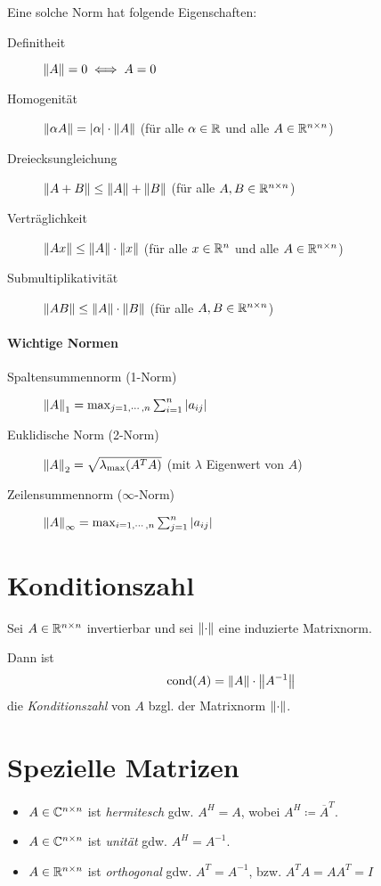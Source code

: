 		Eine solche Norm hat folgende Eigenschaften:
		\begin{description}
			\item[Definitheit] \( \norm{A} = 0 \iff A = 0 \)
			\item[Homogenität] \( \norm{\alpha A} = \abs{\alpha} \cdot \norm{A} \) (für alle \( \alpha \in \mathbb{R} \) und alle \( A \in \mathbb{R}^{n \times n} \))
			\item[Dreiecksungleichung] \( \norm{A + B} \leq \norm{A} + \norm{B} \) (für alle \( A, B \in \mathbb{R}^{n \times n} \))
			\item[Verträglichkeit] \( \norm{Ax} \leq \norm{A} \cdot \norm{x} \) (für alle \( x \in \mathbb{R}^n \) und alle \( A \in \mathbb{R}^{n \times n} \))
			\item[Submultiplikativität] \( \norm{AB} \leq \norm{A} \cdot \norm{B} \) (für alle \( A, B \in \mathbb{R}^{n \times n} \))
		\end{description}

		\paragraph{Wichtige Normen}
			\begin{description}
				\item[Spaltensummennorm (1-Norm)] \( \norm{A}_1 = \max_{j = 1, \cdots, n} \sum_{i = 1}^n \abs{a_{ij}} \)
				\item[Euklidische Norm (2-Norm)] \( \norm{A}_2 = \sqrt{\lambda _ \textrm{max} (A^T A)} \) (mit \(\lambda\) Eigenwert von \( A \))
				\item[Zeilensummennorm (\(\infty\)-Norm)] \( \norm{A}_\infty = \max_{i = 1, \cdots, n} \sum_{j = 1}^n \abs{a_{ij}} \)
			\end{description}

	\section{Konditionszahl}
		Sei \( A \in \mathbb{R}^{n \times n} \) invertierbar und sei \( \norm{\cdot} \) eine induzierte Matrixnorm.

		Dann ist \[ \operatorname{cond}(A) = \norm{A} \cdot \norm{A^{-1}} \] die \textit{Konditionszahl} von \(A\) bzgl. der Matrixnorm \( \norm{\cdot} \).

	\section{Spezielle Matrizen}
		\begin{itemize}
			\item \(A \in \mathbb{C}^{n \times n}\) ist \textit{hermitesch} gdw. \( A^H = A \), wobei \( A^H \coloneqq \overline{A}^T \).
			\item \(A \in \mathbb{C}^{n \times n}\) ist \textit{unität} gdw. \( A^H = A^{-1} \).
			\item \(A \in \mathbb{R}^{n \times n}\) ist \textit{orthogonal} gdw. \( A^T = A^{-1} \), bzw. \( A^TA = AA^T = I \)
		\end{itemize}

